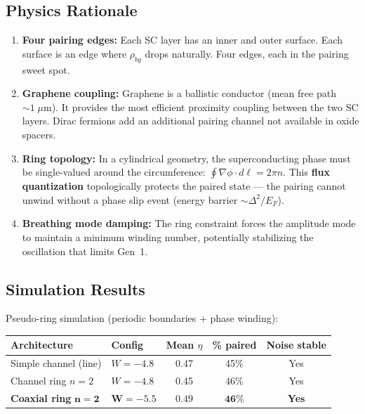 \documentclass[11pt, a4paper]{article}
\begin{document}
\subsection{Physics Rationale}

\begin{enumerate}[nosep]
  \item \textbf{Four pairing edges:} Each SC layer has an inner and
        outer surface. Each surface is an edge where $\rho_{bg}$
        drops naturally. Four edges, each in the pairing sweet spot.
  \item \textbf{Graphene coupling:} Graphene is a ballistic conductor
        (mean free path $\sim 1\;\mu$m). It provides the most
        efficient proximity coupling between the two SC layers. Dirac
        fermions add an additional pairing channel not available in
        oxide spacers.
  \item \textbf{Ring topology:} In a cylindrical geometry, the
        superconducting phase must be single-valued around the
        circumference: $\oint \nabla\phi \cdot d\ell = 2\pi n$. This
        \textbf{flux quantization} topologically protects the paired
        state --- the pairing cannot unwind without a phase slip
        event (energy barrier $\sim \Delta^2 / E_F$).
  \item \textbf{Breathing mode damping:} The ring constraint forces
        the amplitude mode to maintain a minimum winding number,
        potentially stabilizing the oscillation that limits Gen~1.
\end{enumerate}

\subsection{Simulation Results}

Pseudo-ring simulation (periodic boundaries + phase winding):

\begin{center}
\begin{tabular}{@{}llccc@{}}
\toprule
\textbf{Architecture} & \textbf{Config} & \textbf{Mean $\eta$} &
  \textbf{\% paired} & \textbf{Noise stable} \\
\midrule
Simple channel (line) & $W = -4.8$ & 0.47 & 45\% & Yes \\
Channel ring $n = 2$ & $W = -4.8$ & 0.45 & 46\% & Yes \\
\textbf{Coaxial ring} $\mathbf{n = 2}$ & $\mathbf{W = -5.5}$ &
  $\mathbf{0.49}$ & $\mathbf{46\%}$ & \textbf{Yes} \\
\bottomrule
\end{tabular}
\end{center}
\end{document}
